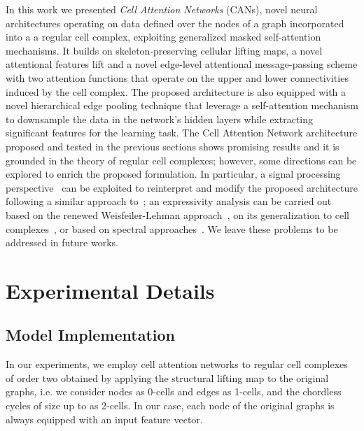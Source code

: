 \documentclass{article}
\begin{document}
In this work we presented \emph{Cell Attention Networks} (CANs),  novel neural architectures operating on data defined over the nodes of a graph incorporated into a
a regular cell complex, exploiting generalized masked self-attention mechanisms. It builds on skeleton-preserving cellular lifting maps, a novel attentional features lift  and a novel edge-level attentional message-passing scheme with two attention functions that operate on the upper and lower connectivities induced by the cell complex.
 The proposed architecture is also equipped with a novel hierarchical edge pooling technique that leverage a self-attention mechanism to downsample the data in the network's hidden layers while extracting significant features for the learning task. The Cell Attention Network architecture proposed and tested in the previous sections shows promising results and it is grounded in the theory of regular cell complexes; however, some directions can be explored to enrich the proposed formulation. In particular, a signal processing perspective~\cite{sardellitti2022cell} can be exploited to reinterpret
 and modify the proposed architecture following a similar approach to~\cite{giusti22}; an expressivity analysis can be carried out based on the renewed Weisfeiler-Lehman approach~\cite{xu2018powerful}, on its generalization to cell complexes~\cite{bodnarcwnet,hajij2022}, or based on spectral approaches~\cite{ribeiro2022aremore}. We leave these problems to be addressed in future works.








\appendix


\section{Experimental Details}\label{sec:additional_exp}


\subsection{Model Implementation}

In our experiments, we employ cell attention networks to regular cell complexes of order two obtained by applying the structural lifting map to the original graphs, i.e. we consider nodes as 0-cells and edges as 1-cells, and the chordless cycles of size up to  as 2-cells. In our case, each node of the original graphs is always equipped with an input feature vector.
\end{document}
